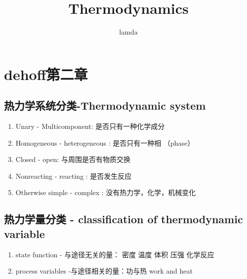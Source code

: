 \documentclass{article}
\title{Thermodynamics}
\author{lamda}
\begin{document}
\maketitle

\section{dehoff第二章}
\subsection{热力学系统分类-Thermodynamic system}
\begin{enumerate}

    \item Unary - Multicomponent: 是否只有一种化学成分
    \item Homogeneous - heterogeneous : 是否只有一种相 （phase）
    \item Closed - open: 与周围是否有物质交换
    \item Nonreacting - reacting : 是否发生反应
    \item Otherwise simple - complex : 没有热力学，化学，机械变化
  \end{enumerate}
\subsection{热力学量分类 - classification of thermodynamic variable}
\begin{enumerate}
  \item state function - 与途径无关的量： 密度 温度 体积 压强 化学反应
  \item process variables -与途径相关的量：功与热 work and heat 
  

\end{enumerate}
\end{document}
